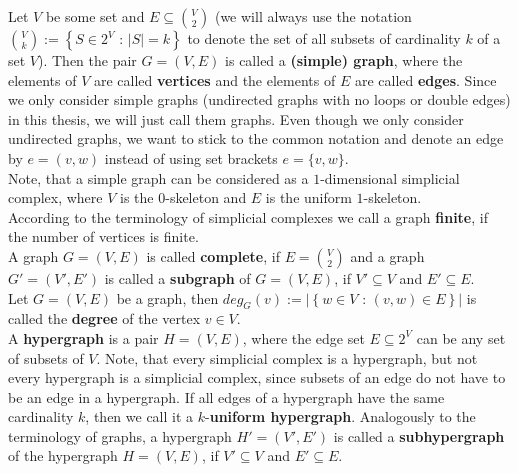Let \(V\) be some set and \(E\subseteq\binom{V}{2}\) (we will always use the notation\\
\(\binom{V}{k}:=\left\{S\in 2^V\text{ : }\left|S\right|=k\right\}\) to denote the set of all subsets of cardinality \(k\) of a set \(V\)). Then the pair \(G=\left(V,E\right)\) is called a \textbf{(simple) graph}, where the elements of \(V\) are called \textbf{vertices} and the elements of \(E\) are called \textbf{edges}. Since we only consider simple graphs (undirected graphs with no loops or double edges) in this thesis, we will just call them graphs. Even though we only consider undirected graphs, we want to stick to the common notation and denote an edge by \(e=(v,w)\) instead of using set brackets \(e=\{v,w\}\).\\
Note, that a simple graph can be considered as a \(1\)-dimensional simplicial complex, where \(V\) is the \(0\)-skeleton and \(E\) is the uniform \(1\)-skeleton.\\
According to the terminology of simplicial complexes we call a graph \textbf{finite}, if the number of vertices is finite.\\
A graph \(G=(V,E)\) is called \textbf{complete}, if \(E=\binom{V}{2}\) and a graph \(G'=(V',E')\) is called a \textbf{subgraph} of \(G=(V,E)\), if \(V'\subseteq V\) and \(E'\subseteq E\).\\
Let \(G=(V,E)\) be a graph, then \(deg_G(v):=\left|\left\{w\in V\text{ : }(v,w)\in E\right\}\right|\) is called the \textbf{degree} of the vertex \(v\in V\).\\
A \textbf{hypergraph} is a pair \(H=(V,E)\), where the edge set \(E\subseteq 2^V\) can be any set of subsets of \(V\). Note, that every simplicial complex is a hypergraph, but not every hypergraph is a simplicial complex, since subsets of an edge do not have to be an edge in a hypergraph. If all edges of a hypergraph have the same cardinality \(k\), then we call it a \(k\)-\textbf{uniform hypergraph}. Analogously to the terminology of graphs, a hypergraph \(H'=(V',E')\) is called a \textbf{subhypergraph} of the hypergraph \(H=(V,E)\), if \(V'\subseteq V\) and \(E'\subseteq E\).